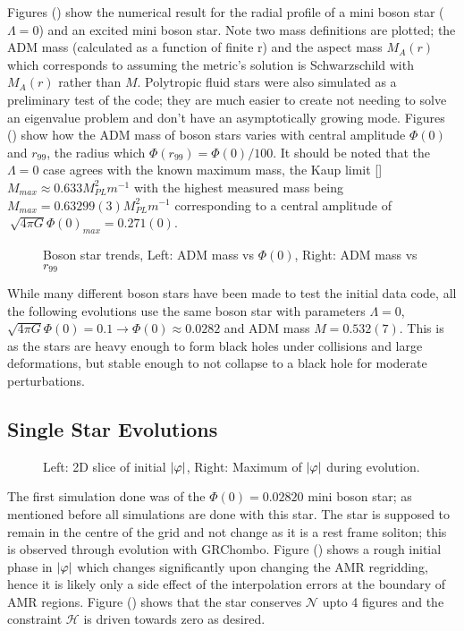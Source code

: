 Figures () show the numerical result for the radial profile of a mini boson star ($\Lambda=0$) and an excited mini boson star. Note two mass definitions are plotted; the ADM mass (calculated as a function of finite r) and the aspect mass $M_A(r)$ which corresponds to assuming the metric's solution is Schwarzschild with $M_A(r)$ rather than $M$. Polytropic fluid stars were also simulated as a preliminary test of the code; they are much easier to create not needing to solve an eigenvalue problem and don't have an asymptotically growing mode. Figures () show how the ADM mass of boson stars varies with central amplitude $\Phi(0)$ and $r_{99}$, the radius which $\Phi(r_{99}) = \Phi(0)/100$. It should be noted that the $\Lambda =0$ case agrees with the known maximum mass, the Kaup limit [] $M_{max} \approx 0.633 {M_{PL}^2}{m^{-1}}$ with the highest measured mass being $ M_{max} = 0.63299(3) {M_{PL}^2}{m^{-1}} $ corresponding to a central amplitude of $\ \sqrt{4\pi G}\Phi(0)_{max} = 0.271(0)$. 

  \begin{figure}[H]
  \caption{Boson star trends, Left: ADM mass vs $\Phi(0)$, Right: ADM mass vs $r_{99}$}
  \centering
  \hfill
\end{figure}

While many different boson stars have been made to test the initial data code, all the following evolutions use the same boson star with parameters $\Lambda=0$, $\sqrt{4\pi G}\Phi(0)=0.1 \rightarrow \Phi(0) \approx 0.0282$ and ADM mass $M=0.532(7)$. This is as the stars are heavy enough to form black holes under collisions and large deformations, but stable enough to not collapse to a black hole for moderate perturbations.


\subsection{Single Star Evolutions}
  \begin{figure}[H]
  \caption{Left: 2D slice of initial $|\varphi|$, Right: Maximum of $|\varphi|$ during evolution.}
  \centering
  \hfill
\end{figure}
The first simulation done was of the $\Phi(0)=0.02820$ mini boson star; as mentioned before all simulations are done with this star. The star is supposed to remain in the centre of the grid and not change as it is a rest frame soliton; this is observed through evolution with GRChombo. Figure () shows a rough initial phase in $|\varphi|$ which changes significantly upon changing the AMR regridding, hence it is likely only a side effect of the interpolation errors at the boundary of AMR regions. Figure () shows that the star conserves $\mathcal{N}$ upto 4 figures and the constraint $\mathcal{H}$ is driven towards zero as desired.

